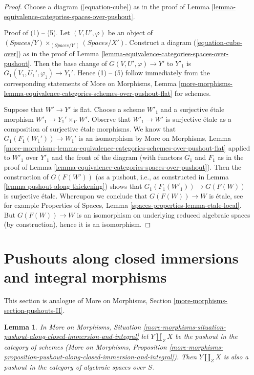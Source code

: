 \documentclass{stacks-project}
\theoremstyle{plain}
\newtheorem{lemma}[subsection]{Lemma}
\theoremstyle{definition}
\theoremstyle{remark}
\numberwithin{equation}{subsection}
\begin{document}
\begin{proof}
Choose a diagram (\ref{equation-cube}) as in the proof of
Lemma \ref{lemma-equivalence-categories-spaces-over-pushout}.

\medskip\noindent
Proof of (1) -- (5). Let $(V, U', \varphi)$ be an object of
$(\textit{Spaces}/Y) \times_{(\textit{Spaces}/Y')} (\textit{Spaces}/X')$.
Construct a diagram (\ref{equation-cube-over}) as in the proof of
Lemma \ref{lemma-equivalence-categories-spaces-over-pushout}.
Then the base change of $G(V, U', \varphi) \to Y'$ to
$Y'_1$ is $G_1(V_1, U_1', \varphi_1) \to Y_1'$. Hence (1) -- (5)
follow immediately from the corresponding statements of
More on Morphisms, Lemma
\ref{more-morphisms-lemma-equivalence-categories-schemes-over-pushout-flat}
for schemes.

\medskip\noindent
Suppose that $W' \to Y'$ is flat. Choose a scheme $W'_1$ and a surjective
\'etale morphism $W'_1 \to Y_1' \times_{Y'} W'$. Observe that $W'_1 \to W'$
is surjective \'etale as a composition of surjective \'etale morphisms. We
know that $G_1(F_1(W_1')) \to W_1'$ is an isomorphism by
More on Morphisms, Lemma
\ref{more-morphisms-lemma-equivalence-categories-schemes-over-pushout-flat}
applied to $W'_1$ over $Y'_1$ and the front of the diagram (with functors
$G_1$ and $F_1$ as in the proof of
Lemma \ref{lemma-equivalence-categories-spaces-over-pushout}).
Then the construction of $G(F(W'))$ (as a pushout, i.e.,
as constructed in Lemma \ref{lemma-pushout-along-thickening}) shows that
$G_1(F_1(W'_1)) \to G(F(W))$ is surjective \'etale. Whereupon we conclude
that $G(F(W)) \to W$ is \'etale, see for example
Properties of Spaces, Lemma \ref{spaces-properties-lemma-etale-local}.
But $G(F(W)) \to W$ is an isomorphism on underlying reduced
algebraic spaces (by construction), hence it is an isomorphism.
\end{proof}







\section{Pushouts along closed immersions and integral morphisms}
\label{section-pushouts-II}

\noindent
This section is analogue of
More on Morphisms, Section \ref{more-morphisms-section-pushouts-II}.

\begin{lemma}
\label{lemma-pushout-along-closed-immersion-and-integral}
In More on Morphisms, Situation
\ref{more-morphisms-situation-pushout-along-closed-immersion-and-integral}
let $Y \amalg_Z X$ be the pushout in the category of schemes
(More on Morphisms, Proposition
\ref{more-morphisms-proposition-pushout-along-closed-immersion-and-integral}).
Then $Y \amalg_Z X$
is also a pushout in the category of algebraic spaces over $S$.
\end{lemma}
\end{document}
